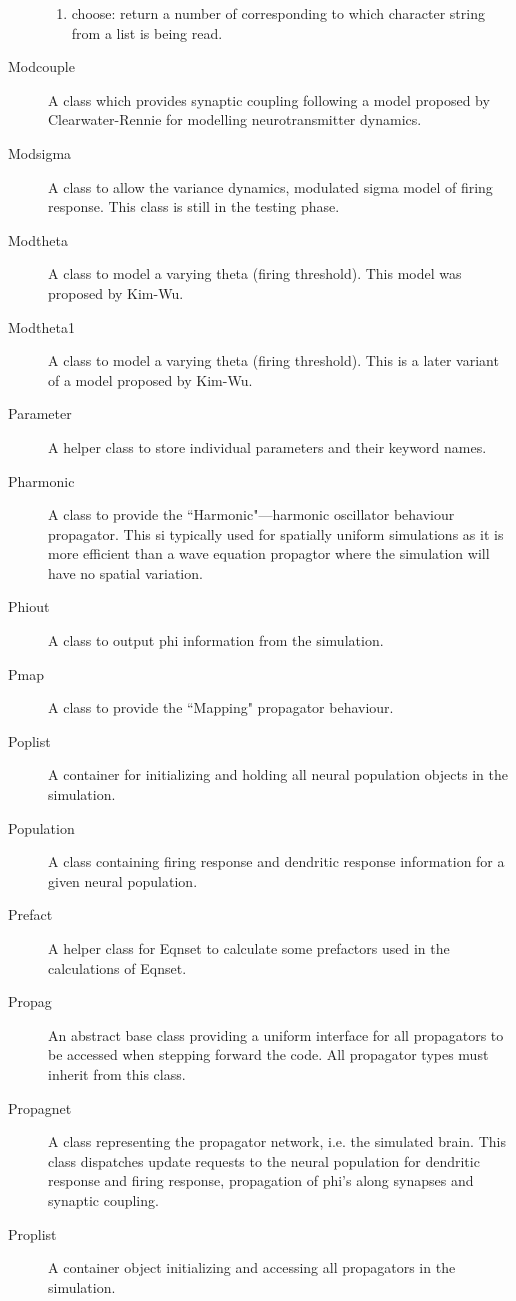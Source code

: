 \documentclass[12pt,a4paper]{article}
\begin{document}
\begin{description}
\begin{enumerate}
	\item choose: return a number of corresponding to which character string from a list is being read.
	\end{enumerate}
\item[Modcouple] A class which provides synaptic coupling following a model proposed by Clearwater-Rennie for modelling neurotransmitter dynamics.
\item[Modsigma] A class to allow the variance dynamics, modulated sigma model of firing response. This class is still in the testing phase.
\item[Modtheta] A class to model a varying theta (firing threshold). This model was proposed by Kim-Wu.
\item[Modtheta1] A class to model a varying theta (firing threshold). This is a later variant of a model proposed by Kim-Wu.
\item[Parameter] A helper class to store individual parameters and their keyword names.
\item[Pharmonic] A class to provide the ``Harmonic"---harmonic oscillator behaviour propagator. This si typically used for spatially uniform simulations as it is more efficient than a wave equation propagtor where the simulation will have no spatial variation.
\item[Phiout] A class to output phi information from the simulation.
\item[Pmap] A class to provide the ``Mapping" propagator behaviour.
\item[Poplist] A container for initializing and holding all neural population objects in the simulation.
\item[Population] A class containing firing response and dendritic response information for a given neural population.
\item[Prefact] A helper class for Eqnset to calculate some prefactors used in the calculations of Eqnset.
\item[Propag] An abstract base class providing a uniform interface for all propagators to be accessed when stepping forward the code. All propagator types must inherit from this class.
\item[Propagnet] A class representing the propagator network, i.e. the simulated brain. This class dispatches update requests to the neural population for dendritic response and firing response, propagation of phi's along synapses and synaptic coupling.
\item[Proplist] A container object initializing and accessing all propagators in the simulation.

\end{description}
\end{document}
